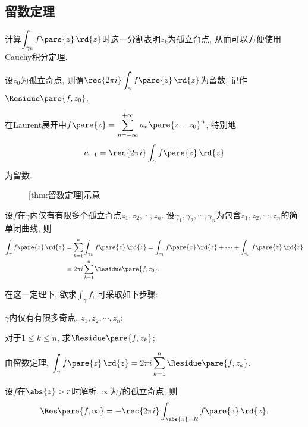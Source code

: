 \documentclass{ctexart}
\begin{document}

\subsection{留数定理} %
\label{sub:留数定理}

计算$\displaystyle \int_{\gamma_k}f\pare{z}\,\rd{z}$时这一分割表明$z_k$为孤立奇点, 从而可以方便使用Cauchy积分定理.
\begin{definition}
    设$z_0$为孤立奇点, 则谓$\displaystyle \rec{2\pi i}\int_\gamma f\pare{z}\,\rd{z}$为留数, 记作$\Residue\pare{f,z_0}$.
\end{definition}
\begin{remark}
    在Laurent展开中$\displaystyle f\pare{z} = \sum_{n=-\infty}^{+\infty} a_n\pare{z-z_0}^n$, 特别地
    \[ a_{-1} = \rec{2\pi i} \int_{\gamma} f\pare{z}\,\rd{z} \]
    为留数.
\end{remark}
\begin{figure}[ht]
    \centering
    \caption{\cref{thm:留数定理}示意}
\end{figure}
\begin{theorem}[留数定理]
    \label{thm:留数定理}
    设$f$在$\gamma$内仅有有限多个孤立奇点$z_1, z_2, \cdots, z_n$. 设$\gamma_1,\gamma_2,\cdots,\gamma_n$为包含$z_1,z_2,\cdots,z_n$的简单闭曲线, 则
    \begin{align*}
        \int_\gamma f\pare{z}\,\rd{z} &= \sum_{k=1}^n \int_{\gamma_k} f\pare{z}\,\rd{z} = \int_{\gamma_1} f\pare{z}\,\rd{z} + \cdots + \int_{\gamma_n} f\pare{z}\,\rd{z} \\
        &= 2\pi i \sum_{k=1}^n \Residue\pare{f,z_0}.
    \end{align*}
\end{theorem}
在这一定理下, 欲求$\displaystyle \int_{\gamma} f$, 可采取如下步骤:
\begin{cenum}
    \item $\gamma$内仅有有限多奇点, $z_1, z_2, \cdots, z_n$;
    \item 对于$1\le k\le n$, 求$\Residue\pare{f,z_k}$;
    \item 由留数定理, $\displaystyle \int_\gamma f\pare{z}\,\rd{z} = 2\pi i \sum_{k=1}^n \Residue\pare{f,z_k}$.
\end{cenum}
\begin{definition}
    设$f$在$\abs{z}>r$时解析, $\infty$为$f$的孤立奇点, 则
    \[ \Res\pare{f,\infty} = -\rec{2\pi i} \int_{\abs{z}=R} f\pare{z}\,\rd{z}. \]
\end{definition}
\end{document}

